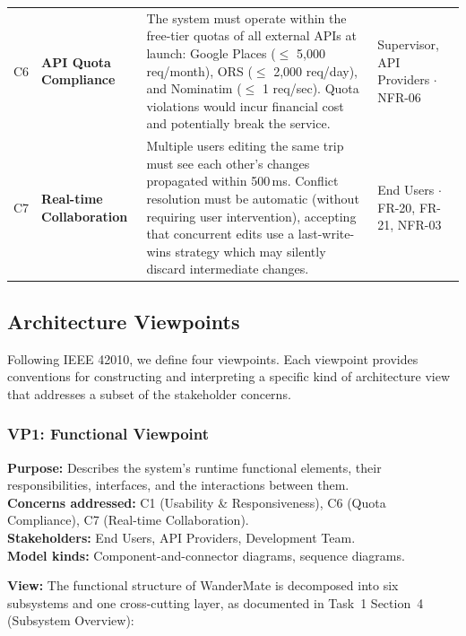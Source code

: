 \documentclass[12pt, a4paper]{article}
\newcommand{\reqid}[1]{\textsc{\small #1}}
\begin{document}
\begin{longtable}{C{0.5cm} L{2.5cm} L{5.8cm} L{3.8cm}}
C6 & \textbf{API Quota Compliance} & The system must operate within the free-tier quotas of all external APIs at launch: Google Places ($\leq$ 5,000 req/month), ORS ($\leq$ 2,000 req/day), and Nominatim ($\leq$ 1 req/sec). Quota violations would incur financial cost and potentially break the service. & Supervisor, API Providers $\cdot$ \reqid{NFR-06} \\

C7 & \textbf{Real-time Collaboration} & Multiple users editing the same trip must see each other's changes propagated within 500\,ms. Conflict resolution must be automatic (without requiring user intervention), accepting that concurrent edits use a last-write-wins strategy which may silently discard intermediate changes. & End Users $\cdot$ \reqid{FR-20}, \reqid{FR-21}, \reqid{NFR-03} \\

\end{longtable}

\subsection{Architecture Viewpoints}

Following IEEE 42010, we define four viewpoints. Each viewpoint provides conventions for constructing and interpreting a specific kind of architecture view that addresses a subset of the stakeholder concerns.

\subsubsection{VP1: Functional Viewpoint}

\begin{tcolorbox}[notebox]
\textbf{Purpose:} Describes the system's runtime functional elements, their responsibilities, interfaces, and the interactions between them.\\[3pt]
\textbf{Concerns addressed:} C1 (Usability \& Responsiveness), C6 (Quota Compliance), C7 (Real-time Collaboration).\\[3pt]
\textbf{Stakeholders:} End Users, API Providers, Development Team.\\[3pt]
\textbf{Model kinds:} Component-and-connector diagrams, sequence diagrams.
\end{tcolorbox}

\textbf{View:} The functional structure of WanderMate is decomposed into six subsystems and one cross-cutting layer, as documented in Task~1 Section~4 (Subsystem Overview):
\end{document}
